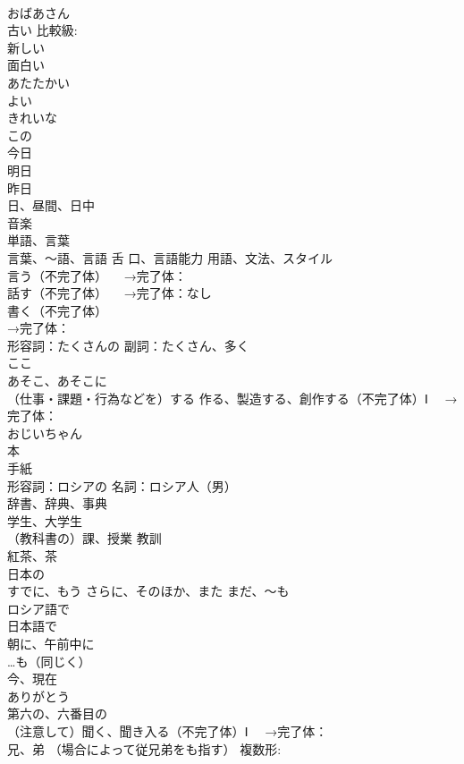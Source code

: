 \documentclass[8pt]{extreport}
\begin{document}
\begin{CJK}{UTF8}{min}
\\	おばあさん
\\	古い 比較級:
\\	新しい
\\	面白い
\\	あたたかい
\\	よい
\\	きれいな
\\	この 
\\	今日
\\	明日
\\	昨日
\\	日、昼間、日中 
\\	音楽
\\	単語、言葉
\\	言葉、～語、言語 舌 口、言語能力 用語、文法、スタイル
\\	言う（不完了体） 　→完了体：
\\	話す（不完了体） 　→完了体：なし
\\	書く（不完了体） 
\\	→完了体：
\\	形容詞：たくさんの 副詞：たくさん、多く
\\	ここ
\\	あそこ、あそこに
\\	（仕事・課題・行為などを）する 作る、製造する、創作する（不完了体）Ⅰ 　→完了体：
\\	おじいちゃん
\\	本
\\	手紙
\\	形容詞：ロシアの 名詞：ロシア人（男）
\\	辞書、辞典、事典
\\	学生、大学生
\\	（教科書の）課、授業 教訓
\\	紅茶、茶
\\	日本の
\\	すでに、もう さらに、そのほか、また まだ、〜も
\\	ロシア語で
\\	日本語で
\\	朝に、午前中に
\\	…も（同じく）
\\	今、現在
\\	ありがとう
\\	[序]第六の、六番目の
\\	（注意して）聞く、聞き入る（不完了体）Ⅰ 　→完了体：
\\	兄、弟 （場合によって従兄弟をも指す） 複数形:

\end{CJK}
\end{document}

